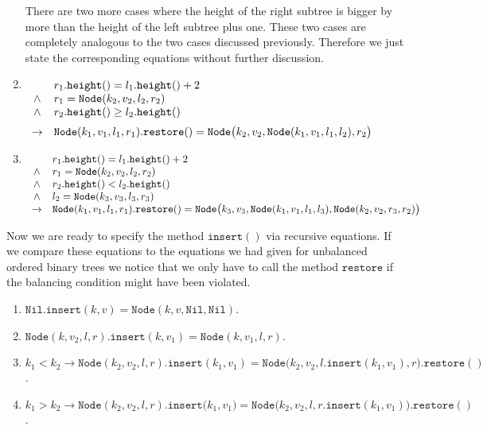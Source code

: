 \begin{enumerate}
      There are two more cases where the height of the right subtree is bigger by more than 
      the height of the left subtree plus one.  These two cases are completely analogous to the two
      cases discussed previously.  Therefore we just state the corresponding equations without
      further discussion.
\item $\begin{array}[t]{cl}
              & r_1.\texttt{height}() = l_1.\texttt{height}() + 2    \\ 
       \wedge & r_1 = \texttt{Node}(k_2,v_2,l_2,r_2)               \\
       \wedge & r_2.\texttt{height}() \geq l_2.\texttt{height}()     \\[0.2cm]
       \rightarrow & \texttt{Node}(k_1,v_1,l_1,r_1).\texttt{restore}() = 
                     \texttt{Node}\bigl(k_2,v_2,\texttt{Node}(k_1,v_1,l_1,l_2),r_2\bigr)
       \end{array}
      $
\item $\begin{array}[t]{cl}
               & r_1.\texttt{height}() = l_1.\texttt{height}() + 2    \\ 
        \wedge & r_1 = \texttt{Node}(k_2,v_2,l_2,r_2)               \\
        \wedge & r_2.\texttt{height}() < l_2.\texttt{height}()     \\
        \wedge & l_2 = \texttt{Node}(k_3,v_3,l_3,r_3)               \\
        \rightarrow & \texttt{Node}(k_1,v_1,l_1,r_1).\texttt{restore}() = 
                      \texttt{Node}\bigl(k_3,v_3,\texttt{Node}(k_1,v_1,l_1,l_3),\texttt{Node}(k_2,v_2,r_3,r_2) \bigr)
        \end{array}
       $

\end{enumerate}
Now we are ready to specify the method  $\texttt{insert}()$ via recursive equations.
If we compare these equations to the equations we had given for unbalanced ordered binary trees we
notice that we only have to call the method $\texttt{restore}$ if the balancing condition might have
been violated.
\begin{enumerate}
\item $\texttt{Nil}.\texttt{insert}(k,v) = \texttt{Node}(k,v, \texttt{Nil}, \texttt{Nil})$.  
\item $\texttt{Node}(k, v_2, l, r).\texttt{insert}(k,v_1) = \texttt{Node}(k, v_1, l, r)$.
\item $k_1 < k_2 \rightarrow 
          \texttt{Node}(k_2, v_2, l, r).\texttt{insert}(k_1, v_1) =
          \texttt{Node}\bigl(k_2, v_2, l.\texttt{insert}(k_1,v_1), r\bigr).\texttt{restore}()$.
\item $k_1 > k_2 \rightarrow 
         \texttt{Node}(k_2, v_2, l, r).\texttt{insert}\bigl(k_1, v_1\bigr) = 
         \texttt{Node}\bigl(k_2, v_2, l, r.\texttt{insert}(k_1,v_1)\bigr).\texttt{restore}()$.
\end{enumerate}

